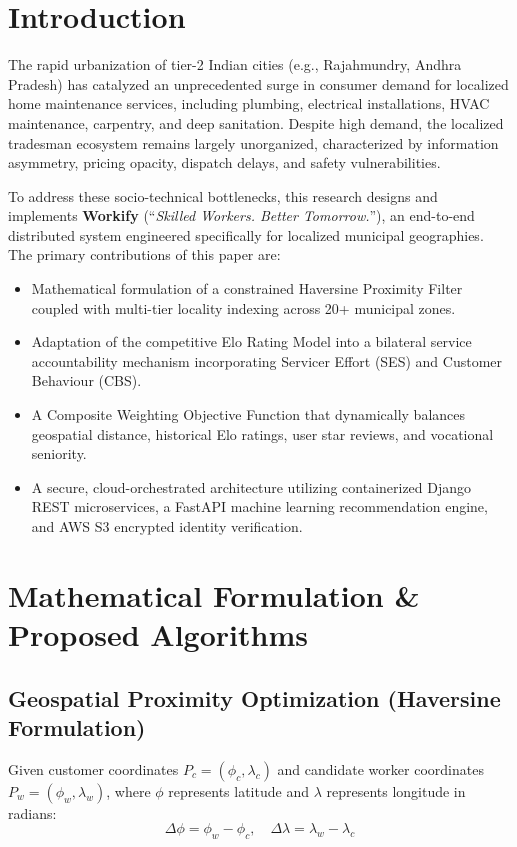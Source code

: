 \documentclass[conference]{IEEEtran}
\begin{document}
\section{Introduction}
The rapid urbanization of tier-2 Indian cities (e.g., Rajahmundry, Andhra Pradesh) has catalyzed an unprecedented surge in consumer demand for localized home maintenance services, including plumbing, electrical installations, HVAC maintenance, carpentry, and deep sanitation. Despite high demand, the localized tradesman ecosystem remains largely unorganized, characterized by information asymmetry, pricing opacity, dispatch delays, and safety vulnerabilities.

To address these socio-technical bottlenecks, this research designs and implements \textbf{Workify} (``\textit{Skilled Workers. Better Tomorrow.}''), an end-to-end distributed system engineered specifically for localized municipal geographies. The primary contributions of this paper are:
\begin{itemize}
    \item Mathematical formulation of a constrained Haversine Proximity Filter coupled with multi-tier locality indexing across 20+ municipal zones.
    \item Adaptation of the competitive Elo Rating Model into a bilateral service accountability mechanism incorporating Servicer Effort (SES) and Customer Behaviour (CBS).
    \item A Composite Weighting Objective Function that dynamically balances geospatial distance, historical Elo ratings, user star reviews, and vocational seniority.
    \item A secure, cloud-orchestrated architecture utilizing containerized Django REST microservices, a FastAPI machine learning recommendation engine, and AWS S3 encrypted identity verification.
\end{itemize}

\section{Mathematical Formulation \& Proposed Algorithms}

\subsection{Geospatial Proximity Optimization (Haversine Formulation)}
Given customer coordinates $P_c = (\phi_c, \lambda_c)$ and candidate worker coordinates $P_w = (\phi_w, \lambda_w)$, where $\phi$ represents latitude and $\lambda$ represents longitude in radians:
\begin{equation}
\Delta\phi = \phi_w - \phi_c, \quad \Delta\lambda = \lambda_w - \lambda_c
\end{equation}
\end{document}
